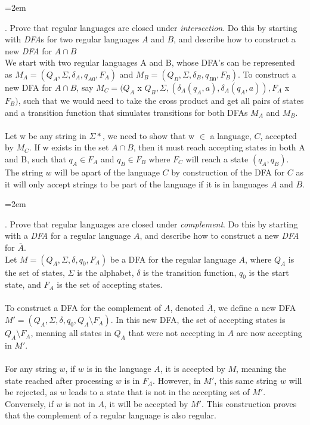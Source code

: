 \documentclass[12pt]{article}
\newcounter{quesnum}
\newcommand{\question}[2][??]{
\begin{list}{\labelitemi}{\leftmargin=2em}
\item [\arabic{quesnum}.] {} {#2}
\end{list}
\addtocounter{quesnum}{1}
}
\begin{document}
\vspace{12pt}

\question[3]{
Prove that regular languages are closed under \emph{intersection}. Do this by starting with \emph{DFA}s for two regular languages $A$ and $B$, and describe how to construct a new \emph{DFA} for $A \cap B$\
\\

We start with two regular languages A and B, whose DFA's can be represented as $M_A = (Q_A, \Sigma, \delta_A, q_{A0}, F_A)$ and $M_B = (Q_B, \Sigma, \delta_B, q_{B0}, F_B)$. To construct a new DFA for $A \cap B$, say $M_C = (Q_A $ x $ Q_B, \Sigma, (\delta_A(q_A,a),\delta_A(q_A,a)) ,F_A $ x $ F_B)$, such that we would need to take the cross product and get all pairs of states and a transition function that simulates transitions for both DFAs $M_A $ and $ M_B$.\\
\\
Let w be any string in $\Sigma*$, we need to show that w $\in$ a language, $C$, accepted by $M_C$. If w exists in the set $A \cap B$, then it must reach accepting states in both A and B, such that $q_A \in F_A$ and $q_B \in F_B$ where $F_C$ will reach a state $(q_A, q_B)$. The string $w$ will be apart of the language $C$ by construction of the DFA for $C$ as it will only accept strings to be part of the language if it is in languages $A$ and $B$.
}


\vspace{12pt}

\question[3]{
Prove that regular languages are closed under \emph{complement}. Do this by starting with a \emph{DFA} for a regular language $A$, and describe how to construct a new \emph{DFA} for $\bar{A}$.
\\

Let $M = (Q_A, \Sigma, \delta, q_0, F_A)$ be a DFA for the regular language $A$, where $Q_A$ is the set of states, $\Sigma$ is the alphabet, $\delta$ is the transition function, $q_0$ is the start state, and $F_A$ is the set of accepting states.\\
\\
To construct a DFA for the complement of $A$, denoted $\bar{A}$, we define a new DFA $M' = (Q_A, \Sigma, \delta, q_0, Q_A \setminus F_A)$. In this new DFA, the set of accepting states is $Q_A \setminus F_A$, meaning all states in $Q_A$ that were not accepting in $A$ are now accepting in $M'$.\\
\\
For any string $w$, if $w$ is in the language $A$, it is accepted by $M$, meaning the state reached after processing $w$ is in $F_A$. However, in $M'$, this same string $w$ will be rejected, as $w$ leads to a state that is not in the accepting set of $M'$. Conversely, if $w$ is not in $A$, it will be accepted by $M'$. This construction proves that the complement of a regular language is also regular.
}
\end{document}
